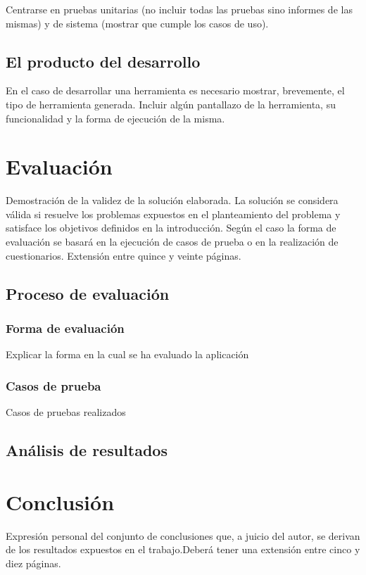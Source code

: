 \documentclass[12pt,a4paper,onecolumn,oneside]{report}
\newcommand{\mychapter}[2]{
	\setcounter{chapter}{#1}
	\setcounter{section}{1}
	\chapter*{#2}
	\addcontentsline{toc}{chapter}{#2}
}
\begin{document}
Centrarse en pruebas unitarias (no incluir todas las pruebas sino informes de las mismas) y de sistema (mostrar que cumple los casos de uso).


\section{El producto del desarrollo}

En el caso de desarrollar una herramienta es necesario mostrar, brevemente, el tipo de herramienta generada. Incluir algún pantallazo de la herramienta, su funcionalidad y la forma de ejecución de la misma.

\chapter{Evaluación}
\label{Evaluación}


Demostración de la validez de la solución elaborada. La solución se considera válida si resuelve los problemas expuestos en el planteamiento del problema y satisface los objetivos definidos en la introducción. Según el caso la forma de evaluación se basará en la ejecución de casos de prueba o en la realización de cuestionarios. Extensión entre quince y veinte páginas.

\section{Proceso de evaluación}

\subsection{Forma de evaluación}

Explicar la forma en la cual se ha evaluado la aplicación

\subsection{Casos de prueba}

Casos de pruebas realizados

\section{Análisis de resultados}



\mychapter{1}{Conclusión}

Expresión personal del conjunto de conclusiones que, a juicio del autor, se derivan de los resultados expuestos en el trabajo.Deberá tener una extensión entre cinco y diez páginas.
\end{document}
